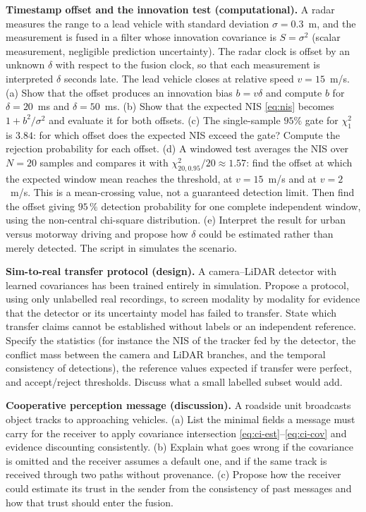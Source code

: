 \begin{prob}\label{prob:ch08:3}
\textbf{Timestamp offset and the innovation test (computational).} A radar measures the range to a lead vehicle with standard deviation $\sigma=0.3$~m, and the measurement is fused in a filter whose innovation covariance is $S=\sigma^2$ (scalar measurement, negligible prediction uncertainty). The radar clock is offset by an unknown $\delta$ with respect to the fusion clock, so that each measurement is interpreted $\delta$ seconds late. The lead vehicle closes at relative speed $v=15$~m/s. (a) Show that the offset produces an innovation bias $b=v\delta$ and compute $b$ for $\delta=20$~ms and $\delta=50$~ms. (b) Show that the expected NIS \eqref{eq:nis} becomes $1+b^2/\sigma^2$ and evaluate it for both offsets. (c) The single-sample $95\%$ gate for $\chi^2_1$ is $3.84$: for which offset does the expected NIS exceed the gate? Compute the rejection probability for each offset. (d) A windowed test averages the NIS over $N=20$ samples and compares it with $\chi^2_{20,0.95}/20\approx1.57$: find the offset at which the expected window mean reaches the threshold, at $v=15$~m/s and at $v=2$~m/s. This is a mean-crossing value, not a guaranteed detection limit. Then find the offset giving $95\,\%$ detection probability for one complete independent window, using the non-central chi-square distribution. (e) Interpret the result for urban versus motorway driving and propose how $\delta$ could be estimated rather than merely detected. The script  in  simulates the scenario.
\end{prob}

\begin{prob}\label{prob:ch08:4}
\textbf{Sim-to-real transfer protocol (design).} A camera--LiDAR detector with learned covariances has been trained entirely in simulation. Propose a protocol, using only unlabelled real recordings, to screen modality by modality for evidence that the detector or its uncertainty model has failed to transfer. State which transfer claims cannot be established without labels or an independent reference. Specify the statistics (for instance the NIS of the tracker fed by the detector, the conflict mass between the camera and LiDAR branches, and the temporal consistency of detections), the reference values expected if transfer were perfect, and accept/reject thresholds. Discuss what a small labelled subset would add.
\end{prob}

\begin{prob}\label{prob:ch08:5}
\textbf{Cooperative perception message (discussion).} A roadside unit broadcasts object tracks to approaching vehicles. (a) List the minimal fields a message must carry for the receiver to apply covariance intersection \eqref{eq:ci-est}--\eqref{eq:ci-cov} and evidence discounting consistently. (b) Explain what goes wrong if the covariance is omitted and the receiver assumes a default one, and if the same track is received through two paths without provenance. (c) Propose how the receiver could estimate its trust in the sender from the consistency of past messages and how that trust should enter the fusion.
\end{prob}

